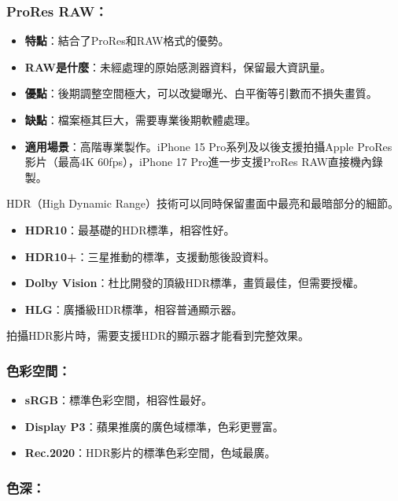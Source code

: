 \subsubsection*{ProRes RAW：}

\begin{itemize}
  \item \textbf{特點}：結合了ProRes和RAW格式的優勢。
  \item \textbf{RAW是什麼}：未經處理的原始感測器資料，保留最大資訊量。
  \item \textbf{優點}：後期調整空間極大，可以改變曝光、白平衡等引數而不損失畫質。
  \item \textbf{缺點}：檔案極其巨大，需要專業後期軟體處理。
  \item \textbf{適用場景}：高階專業製作。iPhone 15 Pro系列及以後支援拍攝Apple ProRes影片（最高4K 60fps），iPhone 17 Pro進一步支援ProRes RAW直接機內錄製。
\end{itemize}


HDR（High Dynamic Range）技術可以同時保留畫面中最亮和最暗部分的細節。

\begin{itemize}
  \item \textbf{HDR10}：最基礎的HDR標準，相容性好。
  \item \textbf{HDR10+}：三星推動的標準，支援動態後設資料。
  \item \textbf{Dolby Vision}：杜比開發的頂級HDR標準，畫質最佳，但需要授權。
  \item \textbf{HLG}：廣播級HDR標準，相容普通顯示器。
\end{itemize}

拍攝HDR影片時，需要支援HDR的顯示器才能看到完整效果。


\subsubsection*{色彩空間：}

\begin{itemize}
  \item \textbf{sRGB}：標準色彩空間，相容性最好。
  \item \textbf{Display P3}：蘋果推廣的廣色域標準，色彩更豐富。
  \item \textbf{Rec.2020}：HDR影片的標準色彩空間，色域最廣。
\end{itemize}

\subsubsection*{色深：}

